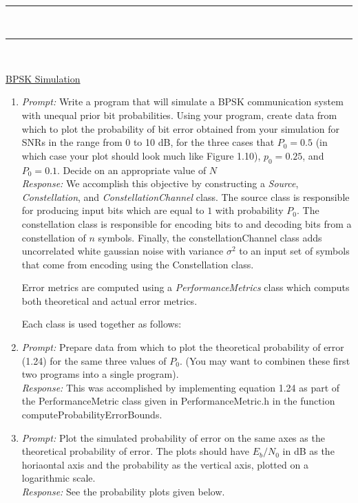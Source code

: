 \documentclass{article}
\newcommand{\problemsep}{\leavevmode\\[0.05in] \rule[\baselineskip/4]{\textwidth}{1pt} \\[0.005in] \rule[\baselineskip]{\textwidth}{1pt}\vspace{-\baselineskip}\leavevmode\\[0.05in]}
\begin{document}
\problemsep 
\pagebreak \begin{center} \vspace{-0.2in} \underline{BPSK Simulation} \end{center}
\begin{enumerate}
	\item {\it Prompt: } Write a program that will simulate a BPSK communication system with unequal prior bit probabilities. Using your program, create data from which to plot the probability of bit error obtained from your simulation for SNRs in the range from 0 to 10 dB, for the three cases that $P_0 = 0.5$ (in which case your plot should look much like Figure 1.10), $p_0 = 0.25$, and $P_0 = 0.1$. Decide on an appropriate value of $N$\\[0.05in]
				{\it Response: } We accomplish this objective by constructing a {\it Source}, {\it Constellation}, and {\it ConstellationChannel} class.  The source class is responsible for producing input bits which are equal to $1$ with probability $P_0$. The constellation class is responsible for encoding bits to and decoding bits from a constellation of $n$ symbols. Finally, the constellationChannel class adds uncorrelated white gaussian noise with variance $\sigma^2$ to an input set of symbols that come from encoding using the Constellation class.



Error metrics are computed using a {\it PerformanceMetrics} class which computs both theoretical and actual error metrics.

Each class is used together as follows:

\item {\it Prompt: } Prepare data from which to plot the theoretical probability of error (1.24) for the same three values of $P_0$. (You may want to combinen these first two programs into a single program). \\[0.05in]
			{\it Response: } This was accomplished by implementing equation 1.24 as part of the PerformanceMetric class given in PerformanceMetric.h in the function computeProbabilityErrorBounds.
\item {\it Prompt: } Plot the simulated probability of error on the same axes as the theoretical probability of error. The plots should have $E_b/N_0$ in dB as the horiaontal axis and the probability as the vertical axis, plotted on a logarithmic scale.\\[0.05in]
			{\it Response: } See the probability plots given below. \\

\end{enumerate}
\end{document}
